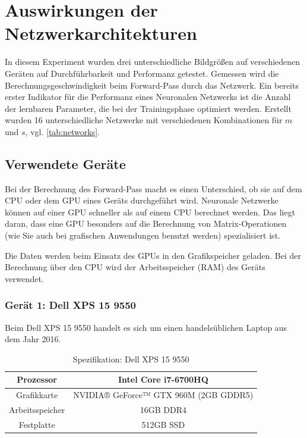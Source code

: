 \section{Auswirkungen der Netzwerkarchitekturen}

In diesem Experiment wurden drei unterschiedliche Bildgrößen auf verschiedenen Geräten auf Durchführbarkeit und Performanz getestet.
Gemessen wird die Berechnungsgeschwindigkeit beim Forward-Pass durch das Netzwerk. Ein bereits erster Indikator für die Performanz eines Neuronalen Netzwerks ist die Anzahl der lernbaren Parameter, die bei der Trainingsphase optimiert werden. Erstellt wurden 16 unterschiedliche Netzwerke mit verschiedenen Kombinationen für $ m $ und $ s $, vgl. \ref{tab:networks}. 

\subsection{Verwendete Geräte}

Bei der Berechnung des Forward-Pass macht es einen Unterschied, ob sie auf dem CPU oder dem GPU eines Geräts durchgeführt wird. Neuronale Netzwerke können auf einer GPU schneller als auf einem CPU berechnet werden. Das liegt daran, dass eine GPU besonders auf die Berechnung von Matrix-Operationen (wie Sie auch bei grafischen Anwendungen benutzt werden) spezialisiert ist.

Die Daten werden beim Einsatz des GPUs in den Grafikspeicher geladen. Bei der Berechnung über den CPU wird der Arbeitsspeicher (RAM) des Geräts verwendet.

\subsubsection{Gerät 1: Dell XPS 15 9550}

Beim Dell XPS 15 9550 handelt es sich um einen handelsüblichen Laptop aus dem Jahr 2016.

\begin{table}[H]
    \centering
    \begin{tabular}{ |c|c| }
        \hline
        Prozessor       & Intel Core i7-6700HQ \\ \hline
        Grafikkarte     & NVIDIA® GeForce™ GTX 960M (2GB GDDR5) \\ \hline
        Arbeitsspeicher & 16GB DDR4  \\ \hline
        Festplatte      & 512GB SSD \\ \hline
    \end{tabular}
    \caption{Spezifikation: Dell XPS 15 9550}
    \label{tab:xps15}
\end{table}

